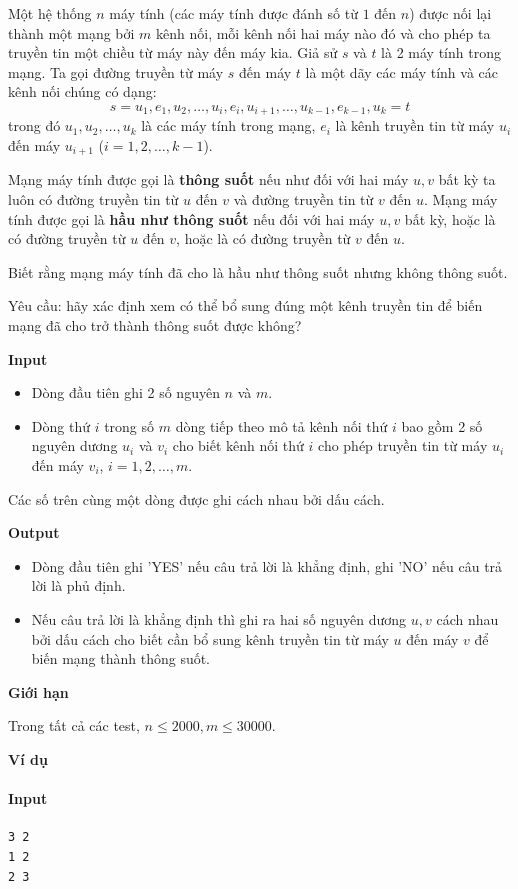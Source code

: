 \documentclass{article}
\begin{document}
Một hệ thống $n$ máy tính (các máy tính được đánh số từ $1$ đến $n$) được nối lại thành một mạng bởi $m$ kênh nối, mỗi kênh nối hai máy nào đó và cho phép ta truyền tin một chiều từ máy này đến máy kia. Giả sử $s$ và $t$ là 2 máy tính trong mạng. Ta gọi đường truyền từ máy $s$ đến máy $t$ là một dãy các máy tính và các kênh nối chúng có dạng:
\[
s = u_1, e_1, u_2, \ldots, u_i, e_i, u_{i+1}, \ldots, u_{k-1}, e_{k-1}, u_k = t
\]
trong đó $u_1, u_2, \ldots, u_k$ là các máy tính trong mạng, $e_i$ là kênh truyền tin từ máy $u_i$ đến máy $u_{i+1}$ ($i = 1, 2, \ldots, k-1$).

Mạng máy tính được gọi là \textbf{thông suốt} nếu như đối với hai máy $u, v$ bất kỳ ta luôn có đường truyền tin từ $u$ đến $v$ và đường truyền tin từ $v$ đến $u$. Mạng máy tính được gọi là \textbf{hầu như thông suốt} nếu đối với hai máy $u, v$ bất kỳ, hoặc là có đường truyền từ $u$ đến $v$, hoặc là có đường truyền từ $v$ đến $u$.

Biết rằng mạng máy tính đã cho là hầu như thông suốt nhưng không thông suốt.

Yêu cầu: hãy xác định xem có thể bổ sung đúng một kênh truyền tin để biến mạng đã cho trở thành thông suốt được không?

\textbf{Input}
\begin{itemize}
    \item Dòng đầu tiên ghi 2 số nguyên $n$ và $m$.
    \item Dòng thứ $i$ trong số $m$ dòng tiếp theo mô tả kênh nối thứ $i$ bao gồm 2 số nguyên dương $u_i$ và $v_i$ cho biết kênh nối thứ $i$ cho phép truyền tin từ máy $u_i$ đến máy $v_i$, $i = 1, 2, \ldots, m$.
\end{itemize}
Các số trên cùng một dòng được ghi cách nhau bởi dấu cách.

\textbf{Output}
\begin{itemize}
    \item Dòng đầu tiên ghi 'YES' nếu câu trả lời là khẳng định, ghi 'NO' nếu câu trả lời là phủ định.
    \item Nếu câu trả lời là khẳng định thì ghi ra hai số nguyên dương $u, v$ cách nhau bởi dấu cách cho biết cần bổ sung kênh truyền tin từ máy $u$ đến máy $v$ để biến mạng thành thông suốt.
\end{itemize}

\textbf{Giới hạn}

Trong tất cả các test, $n \leq 2000, m \leq 30000$.

\textbf{Ví dụ}

\paragraph{Input}
\begin{lstlisting}
3 2
1 2
2 3
\end{lstlisting}
\end{document}
